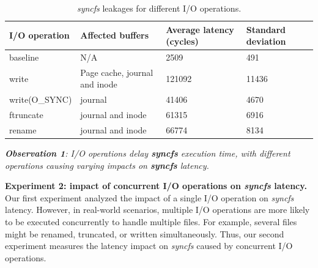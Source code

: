 \begin{table}[tb]
\caption{\textit{syncfs} leakages for different I/O operations.}
\begin{tabular}{|L{2.2cm}|C{2.0cm}|C{1.2cm}|C{1.5cm}|}

\hline
\textbf{I/O operation}         & \textbf{Affected buffers}              & \textbf{Average latency (cycles)} & \textbf{Standard deviation} \\ \hline \hline
baseline  & N/A                                    & 2509                           & 491                      \\ \hline
write                          & Page cache, journal and inode   & 121092                        & 11436                    \\ \hline
write(O\_SYNC)                 & journal                          & 41406                          & 4670                      \\ \hline
ftruncate                      & journal and inode              & 61315                          & 6916                     \\ \hline
rename                         & journal and inode           & 66774                          & 8134                     \\ \hline
\end{tabular}
\label{tb:latency_measurement}

\end{table}



\begin{tcolorbox}[colback=gray!10,colframe=black,boxrule=0.5pt,arc=2mm,outer arc=2mm,]
\textit{\textbf{Observation 1}: I/O operations delay \textbf{syncfs} execution time, with different operations causing varying impacts on \textbf{syncfs} latency.
}
\end{tcolorbox}


\textbf{Experiment 2: impact of concurrent I/O operations on \textit{syncfs} latency.} Our first experiment analyzed the impact of a single I/O operation on \textit{syncfs} latency. However, in real-world scenarios, multiple I/O operations are more likely to be executed concurrently to handle multiple files. 
For example, several files might be renamed, truncated, or written simultaneously. Thus, our second experiment measures the latency impact on \textit{syncfs} caused by concurrent I/O operations.


